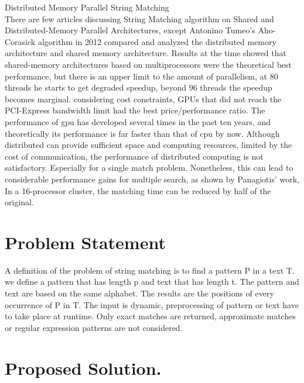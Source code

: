 \documentclass[11pt]{article}       %
\begin{document}
Distributed Memory Parallel String Matching\\
There are few articles discussing String Matching algorithm on Shared and Distributed-Memory Parallel Architectures, except Antonino Tumeo's Aho-Corasick algorithm in 2012 compared and analyzed the distributed memory architecture and shared memory architecture\cite{Distributed-Memory}. Results at the time showed that shared-memory architectures based on multiprocessors were the theoretical best performance, but there is an upper limit to the amount of parallelism, at 80 threads he starts to get degraded speedup, beyond 96 threads the speedup becomes marginal. considering cost constraints, GPUs that did not reach the PCI-Express bandwidth limit had the best price/performance ratio. The performance of gpu has developed several times in the past ten years, and theoretically its performance is far faster than that of cpu by now. Although distributed can provide sufficient space and computing resources, limited by the cost of communication, the performance of distributed computing is not satisfactory. Especially for a single match problem. Nonetheless, this can lead to considerable performance gains for multiple search, as shown by Panagiotis' work\cite{MPI}, In a 16-processor cluster, the matching time can be reduced by half of the original.\\



\section{Problem Statement} \label{problemStatement}


A definition of the problem of string matching is to find a pattern P in a text T. we define a pattern that has length p and text that has length t. The pattern and text are based on the same alphabet. The results are the positions of every occurrence of P in T. The input is dynamic, preprocessing of pattern or text have to take place at runtime. Only exact matches are returned, approximate matches or regular expression patterns are not considered.

\section{Proposed Solution.} \label{proposedSolution}
\end{document}
